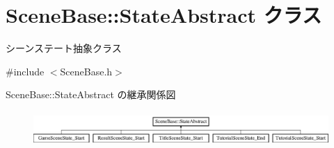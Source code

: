 \hypertarget{class_scene_base_1_1_state_abstract}{}\section{Scene\+Base\+:\+:State\+Abstract クラス}
\label{class_scene_base_1_1_state_abstract}


シーンステート抽象クラス  




{\ttfamily \#include $<$Scene\+Base.\+h$>$}

Scene\+Base\+:\+:State\+Abstract の継承関係図\begin{figure}[H]
\begin{center}
\leavevmode
\includegraphics[height=1.357576cm]{class_scene_base_1_1_state_abstract}
\end{center}
\end{figure}
